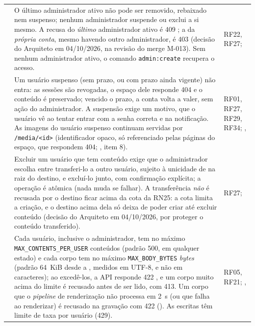 \begin{longtable}{@{}L{1.3cm}L{9.6cm}L{2.8cm}@{}}
 & O último administrador ativo não pode ser removido, rebaixado nem suspenso; nenhum administrador suspende ou exclui a si mesmo. A recusa do \emph{último} administrador ativo é 409 ; a da \emph{própria conta}, mesmo havendo outro administrador, é 403  (decisão do Arquiteto em 04/10/2026, na revisão do merge M-013). Sem nenhum administrador ativo, o comando \texttt{admin:create} recupera o acesso. & RF22, RF27; \\[1pt]
 & Um usuário suspenso (sem prazo, ou com prazo ainda vigente) não entra: as sessões são revogadas, o espaço dele responde 404 e o conteúdo é preservado; vencido o prazo, a conta volta a valer, sem ação do administrador. A suspensão exige um motivo, que o usuário vê ao tentar entrar com a senha correta e na notificação. As imagens do usuário suspenso continuam servidas por \texttt{/media/<id>} (identificador opaco, só referenciado pelas páginas do espaço, que respondem 404; , item 8). & RF01, RF27, RF29, RF34; , \\[1pt]
 & Excluir um usuário que tem conteúdo exige que o administrador escolha entre transferi-lo a outro usuário, sujeito à unicidade de  na raiz do destino, e excluí-lo junto, com confirmação explícita; a operação é atômica (nada muda se falhar). A transferência \emph{não} é recusada por o destino ficar acima da cota da RN25: a cota limita a criação, e o destino acima dela só deixa de poder criar até excluir conteúdo (decisão do Arquiteto em 04/10/2026, por proteger o conteúdo transferido). & RF27; \\[1pt]
 & Cada usuário, inclusive o administrador, tem no máximo \texttt{MAX\_CONTENTS\_PER\_USER} conteúdos (padrão 500, em qualquer estado) e cada corpo tem no máximo \texttt{MAX\_BODY\_BYTES} \emph{bytes} (padrão 64~KiB desde a , medidos em UTF-8, e não em caracteres); ao excedê-los, a API responde 422 , e um corpo muito acima do limite é recusado antes de ser lido, com 413. Um corpo que o \emph{pipeline} de renderização não processa em 2~s (ou que falha ao renderizar) é recusado na gravação com 422  (). As escritas têm limite de taxa por usuário (429). & RF05, RF21; , \\[1pt]

\end{longtable}
